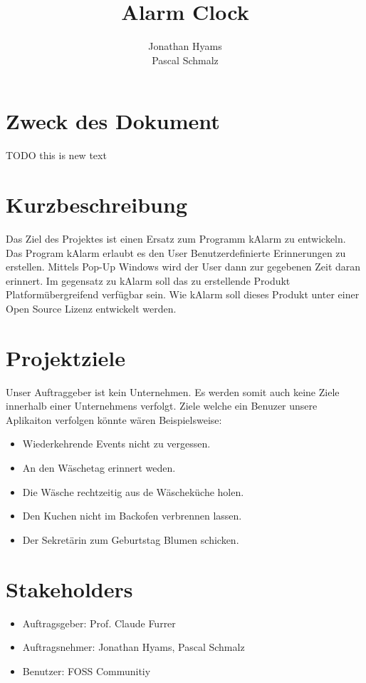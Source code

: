 \documentclass[11pt,titelpage]{scrreprt}
\title{Alarm Clock }
\author{Jonathan Hyams \\Pascal Schmalz}
\begin{document}
\thispagestyle{empty}
\maketitle
\tableofcontents

\pagestyle{fancy}


\begin{abstract}
\end{abstract}
\section{Zweck des Dokument}
TODO this is new text

\section{Kurzbeschreibung}
Das Ziel des Projektes ist einen Ersatz zum Programm kAlarm zu entwickeln.
Das Program kAlarm erlaubt es den User Benutzerdefinierte Erinnerungen zu erstellen. Mittels Pop-Up Windows wird der User dann zur gegebenen Zeit daran erinnert.
Im gegensatz zu kAlarm soll das zu erstellende Produkt Platformübergreifend verfügbar sein. Wie kAlarm soll dieses Produkt unter einer Open Source Lizenz entwickelt werden.
\section{Projektziele}
Unser Auftraggeber ist kein Unternehmen. Es werden somit auch keine Ziele innerhalb einer Unternehmens verfolgt.
Ziele welche ein Benuzer unsere Aplikaiton verfolgen könnte wären Beispielsweise:
\begin{itemize}
 \item Wiederkehrende Events nicht zu vergessen.
 \item An den Wäschetag erinnert weden.
 \item Die Wäsche rechtzeitig aus de Wäscheküche holen.
\item Den Kuchen nicht im Backofen verbrennen lassen.
 \item Der Sekretärin zum Geburtstag Blumen schicken.
 
\end{itemize}

\section{Stakeholders}
\begin{itemize}
\item{Auftragsgeber: Prof. Claude Furrer}
\item{Auftragsnehmer: Jonathan Hyams, Pascal Schmalz}
\item{Benutzer: FOSS Communitiy}
\end{itemize}
\end{document}
